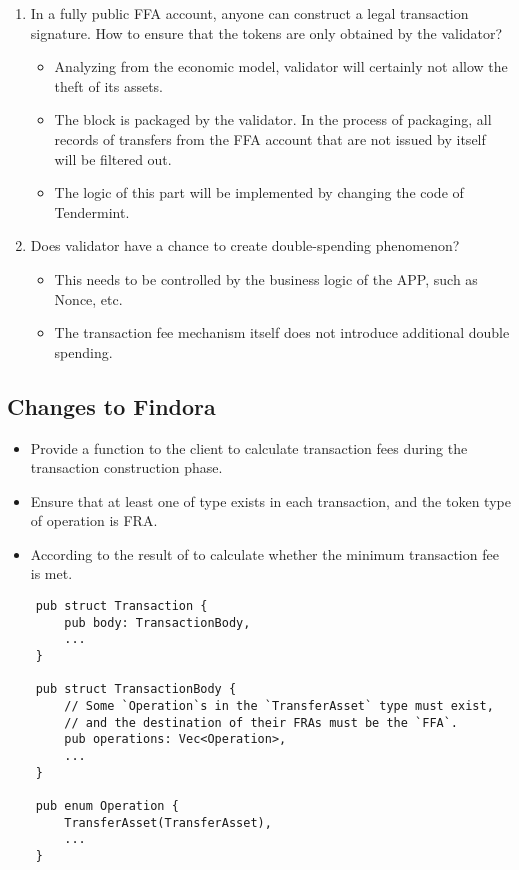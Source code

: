 \begin{enumerate}
    \item In a fully public FFA account, anyone can construct a legal transaction signature.
            How to ensure that the tokens are only obtained by the validator?
        \begin{itemize}
            \item Analyzing from the economic model, validator will certainly not allow the theft of its assets.
            \item The block is packaged by the validator. In the process of packaging,
                    all records of transfers from the FFA account that are not issued by itself will be filtered out.
            \item The logic of this part will be implemented by changing the code of Tendermint.
        \end{itemize}
    \item Does validator have a chance to create double-spending phenomenon?
        \begin{itemize}
            \item This needs to be controlled by the business logic of the APP, such as Nonce, etc.
            \item The transaction fee mechanism itself does not introduce additional double spending.
        \end{itemize}
\end{enumerate}

\subsection{Changes to Findora}

\begin{itemize}
    \item Provide a function to the client to calculate transaction fees
            during the transaction construction phase.
    \item Ensure that at least one  of type 
            exists in each transaction, and the token type of operation is FRA.
    \item According to the result of 
            to calculate whether the minimum transaction fee is met.
\end{itemize}

\begin{lstlisting}
    pub struct Transaction {
        pub body: TransactionBody,
        ...
    }

    pub struct TransactionBody {
        // Some `Operation`s in the `TransferAsset` type must exist,
        // and the destination of their FRAs must be the `FFA`.
        pub operations: Vec<Operation>,
        ...
    }

    pub enum Operation {
        TransferAsset(TransferAsset),
        ...
    }
\end{lstlisting}

